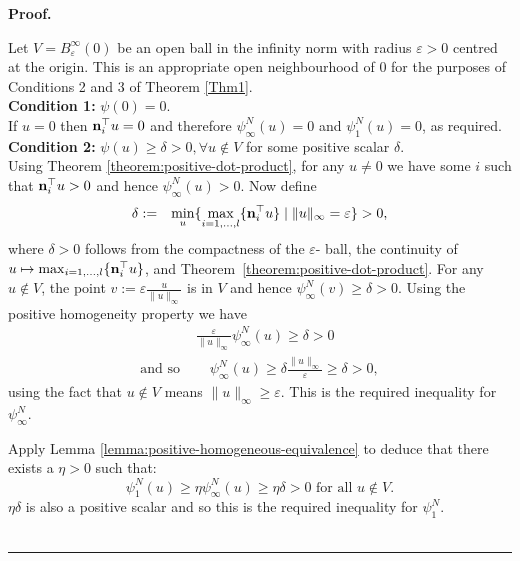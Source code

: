 \documentclass[preprint, 1p, review]{elsarticle}
\newenvironment{proof}[1][Proof]{\noindent\textbf{#1.} }{\ \rule{0.5em}{0.5em}}
\begin{document}
\begin{proof} 
	
	Let $V= B^{\infty}_{\varepsilon} (0)$ be an open ball in the infinity norm with radius $\varepsilon >0$ centred at the origin. This is an appropriate open neighbourhood of $0$ for the purposes of Conditions 2 and 3 of Theorem \ref{Thm1}.
	\\
	
	\textbf{Condition 1: } $\psi(0) = 0$. \\
	If $u=0$ then $\text{\bf{n}}_i^{\top} u=0$ and therefore $\psi_{\infty}^{N} (u) =0$ and $\psi_1^{N} (u) = 0$, as required.\\
	
	\textbf{Condition 2: } $\psi(u) \geq \delta > 0, \forall u \not\in V$ for some positive scalar $\delta$. \\
	Using Theorem \ref{theorem:positive-dot-product}, for any $u \ne 0$ we have some $i$ such that $ \text{\bf{n}}_i^{\top} u >0$ and hence $\psi_{\infty}^{N} (u) >0$. Now define 
	\begin{eqnarray}\label{eq:pospen-con2-1}
		\delta &:=& \min_u \{ \max_{i=1,\dots,l} \{ \text{\bf{n}}_i^{\top} u \} \mid \|u \|_\infty = \varepsilon \}   > 0,
	\end{eqnarray}
	where $\delta > 0$ follows from the compactness of the $\varepsilon$- ball, the continuity of $u \mapsto \max_{i=1,\dots,l} \{ \text{\bf{n}}_i^{\top} u \}$, and Theorem~\ref{theorem:positive-dot-product}. For any $u \notin V$, the point $v := \varepsilon \frac{u}{\|u\|_{\infty}}$ is in $V$ and hence $\psi_{\infty}^N (v) \geq \delta >0$. Using the 
	positive homogeneity property we have 
	\begin{eqnarray*}
		&\frac{\varepsilon}{\|u\|_\infty}\psi_{\infty}^N (u) \geq \delta >0 \\
		\text{and so } &\quad \psi_{\infty}^N (u) \geq \delta \frac{\|u\|_{\infty}}{\varepsilon} \geq \delta >0,
	\end{eqnarray*}
	using the fact that $u \notin V$ means $\|u\|_{\infty} \geq \varepsilon$. This is the required inequality for $ \psi_{\infty}^N$.
	
	Apply Lemma \ref{lemma:positive-homogeneous-equivalence} to deduce that there exists a $\eta > 0$ such that:
	$$\psi_{1}^N (u) \geq \eta \psi_{\infty}^N (u) \geq \eta \delta >0 \text{ for all } u \notin V. $$
	$\eta \delta$ is also a positive scalar and so this is the required inequality for $\psi_{1}^N$.
	\\
	

\end{proof}
\end{document}
